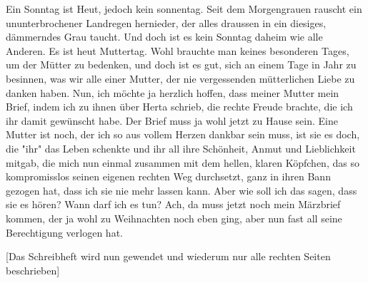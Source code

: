 \def\day{16. Mai 1943}
\mktitle

Ein Sonntag ist Heut, jedoch kein sonnentag.
Seit dem Morgengrauen rauscht ein ununterbrochener Landregen hernieder, der alles draussen in ein diesiges, d\"{a}mmerndes Grau taucht.
Und doch ist es kein Sonntag daheim wie alle Anderen.
Es ist heut Muttertag.
Wohl brauchte man keines besonderen Tages, um der M\"{u}tter zu bedenken, und doch ist es gut, sich an einem Tage in Jahr zu besinnen, was wir alle einer Mutter, der nie vergessenden m\"{u}tterlichen Liebe zu danken haben.
Nun, ich m\"{o}chte ja herzlich hoffen, dass meiner Mutter mein Brief, indem ich zu ihnen \"{u}ber Herta schrieb, die rechte Freude brachte, die ich ihr damit gew\"{u}nscht habe.
Der Brief muss ja wohl jetzt zu Hause sein.
Eine Mutter ist noch, der ich so aus vollem Herzen dankbar sein muss, ist sie es doch, die "ihr" das Leben schenkte und ihr all ihre Sch\"{o}nheit, Anmut und Lieblichkeit mitgab, die mich nun einmal zusammen mit dem hellen, klaren K\"{o}pfchen, das so kompromisslos seinen eigenen rechten Weg durchsetzt, ganz in ihren Bann gezogen hat, dass ich sie nie mehr lassen kann.
Aber wie soll ich das sagen, dass sie es h\"{o}ren?
Wann darf ich es tun?
Ach, da muss jetzt noch mein M\"{a}rzbrief kommen, der ja wohl zu Weihnachten noch eben ging, aber nun fast all seine Berechtigung verlogen hat.

\vfill
{\color{red} [Das Schreibheft wird nun gewendet und wiederum nur alle rechten Seiten beschrieben] }

\clearpage
